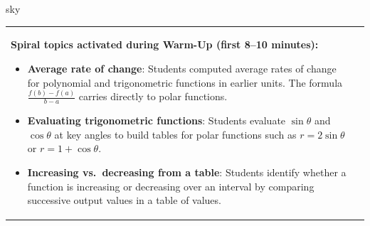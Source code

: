 \documentclass[10pt]{article}
\begin{document}
\begin{skillbox}{sky}
\begin{tabularx}{\linewidth}{@{}X c@{}}
\begin{minipage}[t]{0.96\linewidth}\vspace{0pt}
\textbf{Spiral topics activated during Warm-Up (first 8--10 minutes):}
\begin{itemize}[leftmargin=1.4em, itemsep=2pt]
  \item \textbf{Average rate of change}: Students computed average rates of change for
    polynomial and trigonometric functions in earlier units. The formula
    $\frac{f(b)-f(a)}{b-a}$ carries directly to polar functions.
  \item \textbf{Evaluating trigonometric functions}: Students evaluate $\sin\theta$ and
    $\cos\theta$ at key angles to build tables for polar functions such as
    $r = 2\sin\theta$ or $r = 1 + \cos\theta$.
  \item \textbf{Increasing vs.\ decreasing from a table}: Students identify whether a
    function is increasing or decreasing over an interval by comparing successive
    output values in a table of values.
\end{itemize}
\end{minipage}
&
\end{tabularx}
\end{skillbox}

\vspace{0.08in}
\end{document}
